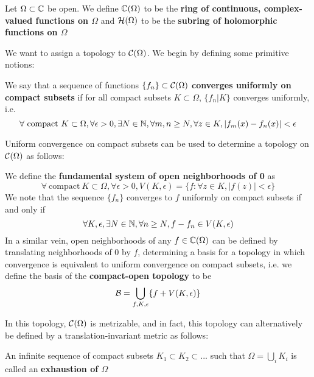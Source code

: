 \documentclass{article}
\begin{document}
\begin{definition}
Let \(\Omega \subset \mathbb{C}\) be open. We define \(\mathbb{C}(\Omega)\) to be the \textbf{ring of continuous, complex-valued functions on \(\Omega\)} and \(\mathcal{H}(\Omega)\) to be the \textbf{subring of holomorphic functions on \(\Omega\)}
\end{definition}
We want to assign a topology to \(\mathcal{C}(\Omega)\). We begin by defining some primitive notions:
\begin{definition}
We say that a sequence of functions \(\{f_n\} \subset \mathcal{C}(\Omega)\) \textbf{converges uniformly on compact subsets} if for all compact subsets \(K \subset \Omega\), \(\{f_n | K\}\) converges uniformly, i.e.
\begin{equation}\forall \ \text{compact} \ K \subset \Omega, \forall \epsilon > 0, \exists N \in \mbb{N}, \forall m, n \geq N, \forall z \in K, |f_m(x) - f_n(x)| < \epsilon\end{equation}
\end{definition}
Uniform convergence on compact subsets can be used to determine a topology on \(\mathcal{C}(\Omega)\) as follows:
\begin{definition}
We define the \textbf{fundamental system of open neighborhoods of 0} as
\begin{equation}\forall \ \text{compact} \ K \subset \Omega, \forall \epsilon > 0, V(K, \epsilon) = \{f: \forall z \in K, |f(z)| < \epsilon\}\end{equation}
We note that the sequence \(\{f_n\}\) converges to \(f\) uniformly on compact subsets if and only if
\begin{equation}\forall K, \epsilon, \exists N \in \mathbb{N}, \forall n \geq N, f - f_n \in V(K, \epsilon)\end{equation}
In a similar vein, open neighborhoods of any \(f \in \mathbb{C}(\Omega)\) can be defined by translating neighborhoods of 0 by \(f\), determining a basis for a topology in which convergence is equivalent to uniform convergence on compact subsets, i.e. we define the basis of the \textbf{compact-open topology} to be
\begin{equation}\mathcal{B} = \bigcup_{f, K, \epsilon}\{f + V(K, \epsilon)\}\end{equation}
\end{definition}
In this topology, \(\mathcal{C}(\Omega)\) is metrizable, and in fact, this topology can alternatively be defined by a translation-invariant metric as follows:
\begin{definition}[Exhausion]
An infinite sequence of compact subsets \(K_1 \subset K_2 \subset ...\) such that \(\Omega = \bigcup_i K_i\) is called an \textbf{exhaustion of \(\Omega\)}
\end{definition}
\end{document}
